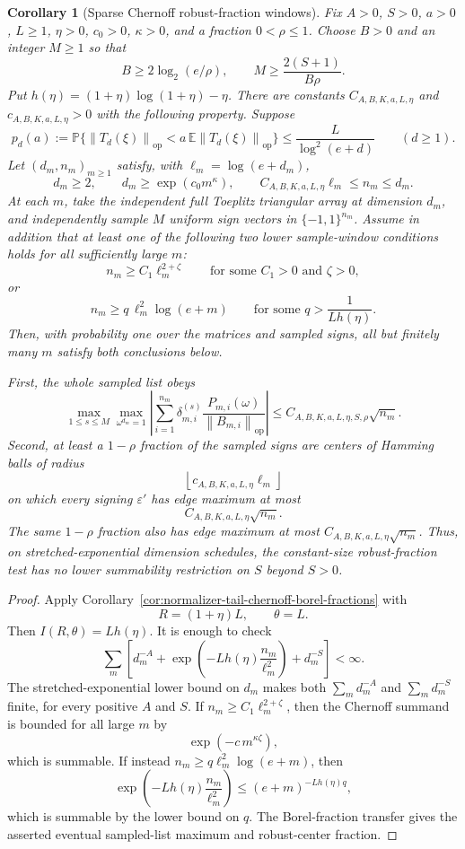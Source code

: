 \documentclass[11pt]{amsart}
\numberwithin{equation}{section}
\newtheorem{corollary}[theorem]{Corollary}
\theoremstyle{definition}
\theoremstyle{remark}
\newcommand{\op}{\mathrm{op}}
\newcommand{\Prob}{\mathbb P}
\newcommand{\Exp}{\mathbb E}
\newcommand{\norm}[1]{\left\lVert #1\right\rVert}
\newcommand{\eps}{\varepsilon}
\begin{document}
\begin{corollary}[Sparse Chernoff robust-fraction windows]
\label{cor:normalizer-tail-chernoff-borel-window-fractions}
Fix \(A>0\), \(S>0\), \(a>0\), \(L\ge1\), \(\eta>0\), \(c_0>0\),
\(\kappa>0\), and a fraction \(0<\rho\le1\).  Choose \(B>0\) and an integer
\(M\ge1\) so that
\[
  B\ge 2\log_2(e/\rho),
  \qquad
  M\ge \frac{2(S+1)}{B\rho}.
\]
Put \(h(\eta)=(1+\eta)\log(1+\eta)-\eta\).  There are constants
\(C_{A,B,K,a,L,\eta}\) and \(c_{A,B,K,a,L,\eta}>0\) with the following
property.  Suppose
\[
  p_d(a):=\Prob\{\norm{T_d(\xi)}_{\op}
      <a\,\Exp\norm{T_d(\xi)}_{\op}\}
  \le \frac{L}{\log^2(e+d)}
  \qquad(d\ge1).
\]
Let \((d_m,n_m)_{m\ge1}\) satisfy, with \(\ell_m=\log(e+d_m)\),
\[
  d_m\ge2,\qquad
  d_m\ge \exp(c_0m^\kappa),\qquad
  C_{A,B,K,a,L,\eta}\ell_m\le n_m\le d_m .
\]
At each \(m\), take the independent full Toeplitz triangular array at dimension
\(d_m\), and independently sample \(M\) uniform sign vectors in
\(\{-1,1\}^{n_m}\).
Assume in addition that at least one of the following two lower sample-window
conditions holds for all sufficiently large \(m\):
\[
  n_m\ge C_1\ell_m^{2+\zeta}
  \qquad\text{for some } C_1>0 \text{ and } \zeta>0,
\]
or
\[
  n_m\ge q\,\ell_m^2\log(e+m)
  \qquad\text{for some } q>\frac1{Lh(\eta)} .
\]
Then, with probability one over the matrices and sampled signs, all but
finitely many \(m\) satisfy both conclusions below.

First, the whole sampled list obeys
\[
  \max_{1\le s\le M}\max_{\omega^{d_m}=1}
  \left|\sum_{i=1}^{n_m}\delta_{m,i}^{(s)}
  \frac{P_{m,i}(\omega)}{\norm{B_{m,i}}_{\op}}\right|
  \le C_{A,B,K,a,L,\eta,S,\rho}\sqrt{n_m}.
\]
Second, at least a \(1-\rho\) fraction of the sampled signs are centers of
Hamming balls of radius
\[
  \left\lfloor c_{A,B,K,a,L,\eta}\ell_m\right\rfloor
\]
on which every signing \(\eps'\) has edge maximum at most
\[
  C_{A,B,K,a,L,\eta}\sqrt{n_m}.
\]
The same \(1-\rho\) fraction also has edge maximum at most
\(C_{A,B,K,a,L,\eta}\sqrt{n_m}\).  Thus, on stretched-exponential dimension
schedules, the constant-size robust-fraction test has no lower summability
restriction on \(S\) beyond \(S>0\).
\end{corollary}

\begin{proof}
Apply Corollary~\ref{cor:normalizer-tail-chernoff-borel-fractions} with
\[
  R=(1+\eta)L,\qquad \theta=L.
\]
Then \(I(R,\theta)=Lh(\eta)\).  It is enough to check
\[
  \sum_m\left[
  d_m^{-A}
  +\exp\left(-Lh(\eta)\frac{n_m}{\ell_m^2}\right)
  +d_m^{-S}
  \right]<\infty .
\]
The stretched-exponential lower bound on \(d_m\) makes both
\(\sum_m d_m^{-A}\) and \(\sum_m d_m^{-S}\) finite, for every positive \(A\)
and \(S\).  If \(n_m\ge C_1\ell_m^{2+\zeta}\), then the Chernoff summand is
bounded for all large \(m\) by
\[
  \exp(-c\,m^{\kappa\zeta}),
\]
which is summable.  If instead \(n_m\ge q\ell_m^2\log(e+m)\), then
\[
  \exp\left(-Lh(\eta)\frac{n_m}{\ell_m^2}\right)
  \le (e+m)^{-Lh(\eta)q},
\]
which is summable by the lower bound on \(q\).  The Borel-fraction transfer
gives the asserted eventual sampled-list maximum and robust-center fraction.
\end{proof}
\end{document}
